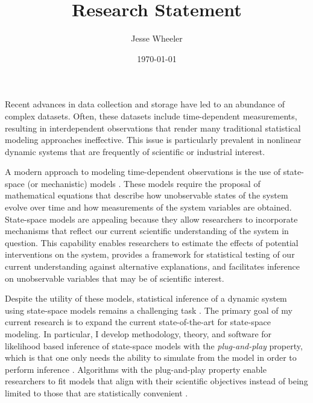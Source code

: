 \documentclass{article}
\title{Research Statement}
\author{Jesse Wheeler}
\date{\today}
\begin{document}
\rule{0mm}{1mm}
\vspace{-20mm}


\vspace{1mm}

\rule{0mm}{1mm}

\vspace{3mm}
\rule{0mm}{1mm}

\vspace{4mm}

\noindent Recent advances in data collection and storage have led to an abundance of complex datasets.
Often, these datasets include time-dependent measurements, resulting in interdependent observations that render many traditional statistical modeling approaches ineffective.
This issue is particularly prevalent in nonlinear dynamic systems that are frequently of scientific or industrial interest.

A modern approach to modeling time-dependent observations is the use of state-space (or mechanistic) models \cite{durbin12}.
These models require the proposal of mathematical equations that describe how unobservable states of the system evolve over time and how measurements of the system variables are obtained.
State-space models are appealing because they allow researchers to incorporate mechanisms that reflect our current scientific understanding of the system in question.
This capability enables researchers to estimate the effects of potential interventions on the system, provides a framework for statistical testing of our current understanding against alternative explanations, and facilitates inference on unobservable variables that may be of scientific interest.

Despite the utility of these models, statistical inference of a dynamic system using state-space models remains a challenging task \cite{auger16}.
The primary goal of my current research is to expand the current state-of-the-art for state-space modeling.
In particular, I develop methodology, theory, and software for likelihood based inference of state-space models with the {\it plug-and-play} property, which is that one only needs the ability to simulate from the model in order to perform inference \cite{breto09}.
Algorithms with the plug-and-play property enable researchers to fit models that align with their scientific objectives instead of being limited to those that are statistically convenient \cite{wheeler24}.
\end{document}
